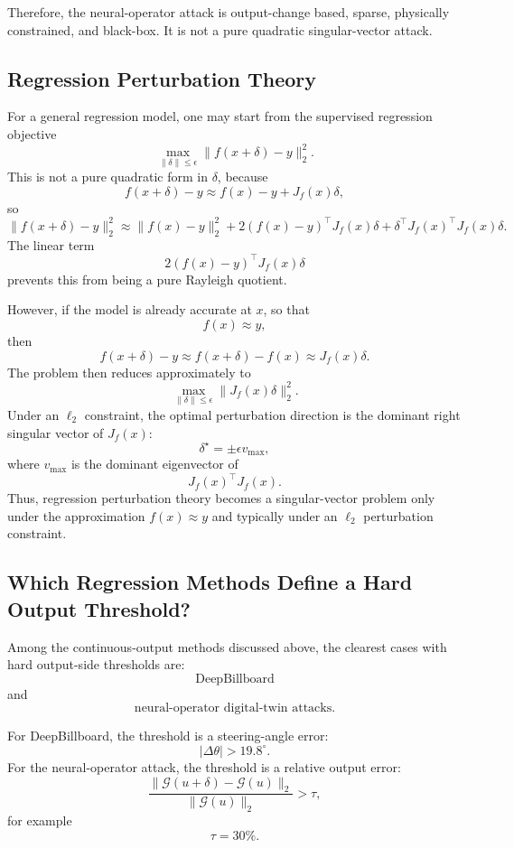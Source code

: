 \documentclass{article}
\begin{document}
Therefore, the neural-operator attack is output-change based, sparse, physically constrained, and black-box. It is not a pure quadratic singular-vector attack.

\subsection{Regression Perturbation Theory}

For a general regression model, one may start from the supervised regression objective
\[
    \max_{\|\delta\|\leq \epsilon}
    \|f(x+\delta)-y\|_2^2.
\]
This is not a pure quadratic form in \(\delta\), because
\[
    f(x+\delta)-y
    \approx
    f(x)-y+J_f(x)\delta,
\]
so
\[
    \|f(x+\delta)-y\|_2^2
    \approx
    \|f(x)-y\|_2^2
    +
    2(f(x)-y)^\top J_f(x)\delta
    +
    \delta^\top J_f(x)^\top J_f(x)\delta.
\]
The linear term
\[
    2(f(x)-y)^\top J_f(x)\delta
\]
prevents this from being a pure Rayleigh quotient.

However, if the model is already accurate at \(x\), so that
\[
    f(x)\approx y,
\]
then
\[
    f(x+\delta)-y
    \approx
    f(x+\delta)-f(x)
    \approx
    J_f(x)\delta.
\]
The problem then reduces approximately to
\[
    \max_{\|\delta\|\leq \epsilon}
    \|J_f(x)\delta\|_2^2.
\]
Under an \(\ell_2\) constraint, the optimal perturbation direction is the dominant right singular vector of \(J_f(x)\):
\[
    \delta^\star
    =
    \pm \epsilon v_{\max},
\]
where \(v_{\max}\) is the dominant eigenvector of
\[
    J_f(x)^\top J_f(x).
\]
Thus, regression perturbation theory becomes a singular-vector problem only under the approximation \(f(x)\approx y\) and typically under an \(\ell_2\) perturbation constraint.

\subsection{Which Regression Methods Define a Hard Output Threshold?}

Among the continuous-output methods discussed above, the clearest cases with hard output-side thresholds are:
\[
    \text{DeepBillboard}
\]
and
\[
    \text{neural-operator digital-twin attacks}.
\]

For DeepBillboard, the threshold is a steering-angle error:
\[
    |\Delta\theta|>19.8^\circ.
\]
For the neural-operator attack, the threshold is a relative output error:
\[
    \frac{
        \|\mathcal{G}(u+\delta)-\mathcal{G}(u)\|_2
    }{
        \|\mathcal{G}(u)\|_2
    }
    >
    \tau,
\]
for example
\[
    \tau=30\%.
\]
\end{document}
